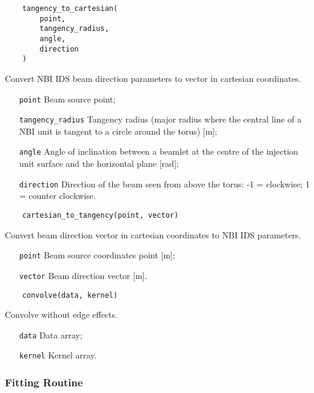 \documentclass[../../main.tex]{subfiles}
\begin{document}
\begin{verbatim}
    tangency_to_cartesian(
        point, 
        tangency_radius, 
        angle, 
        direction
    )
\end{verbatim}

Convert NBI IDS beam direction parameters to vector in cartesian coordinates.

\begin{itemize}[align=left]
    \item[\texttt{point}] Beam source point;
    \item[\texttt{tangency\_radius}] Tangency radius (major radius where the central line of a NBI unit is tangent to a circle around the torus) [m];
    \item[\texttt{angle}] Angle of inclination between a beamlet at the centre of the injection unit surface and the horizontal plane [rad];
    \item[\texttt{direction}] Direction of the beam seen from above the torus: -1 = clockwise; 1 = counter clockwise.
\end{itemize}

\begin{verbatim}
    cartesian_to_tangency(point, vector)
\end{verbatim}

Convert beam direction vector in cartesian coordinates to NBI IDS parameters.

\begin{itemize}[align=left]
    \item[\texttt{point}] Beam source coordinates point [m];
    \item[\texttt{vector}] Beam direction vector [m].
\end{itemize}

\begin{verbatim}
    convolve(data, kernel)
\end{verbatim}

Convolve without edge effects.

\begin{itemize}[align=left]
    \item[\texttt{data}] Data array;
    \item[\texttt{kernel}] Kernel array.
\end{itemize}

\subsubsection{Fitting Routine}%
\label{sec:fitting}
\end{document}
